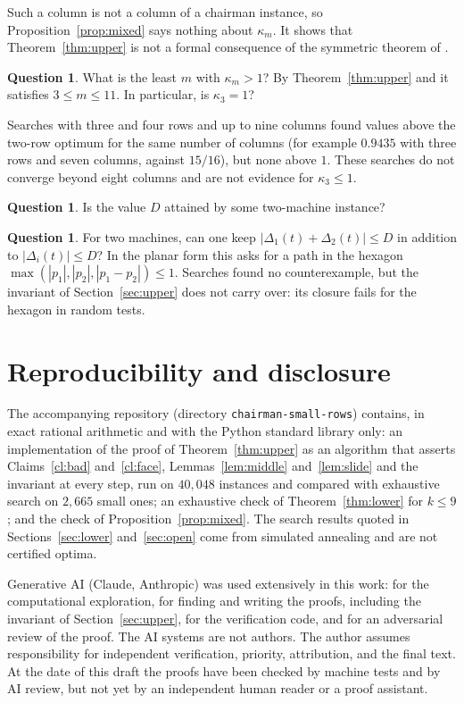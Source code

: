 \documentclass[11pt]{article}
\theoremstyle{definition}
\newtheorem{question}[theorem]{Question}
\newcommand{\disc}{\Delta}
\begin{document}
Such a column is not a column of a chairman instance, so
Proposition~\ref{prop:mixed} says nothing about $\kappa_m$.  It shows that
Theorem~\ref{thm:upper} is not a formal consequence of the symmetric
theorem of \citep{LundMagazinov2015}.

\begin{question}
What is the least $m$ with $\kappa_m>1$?  By Theorem~\ref{thm:upper} and
\citep{Muffatti2026} it satisfies $3\le m\le11$.  In particular, is
$\kappa_3=1$?
\end{question}

Searches with three and four rows and up to nine columns found values
above the two-row optimum for the same number of columns (for example
$0.9435$ with three rows and seven columns, against $15/16$), but none
above $1$.  These searches do not converge beyond eight columns and are
not evidence for $\kappa_3\le1$.

\begin{question}
Is the value $D$ attained by some two-machine instance?
\end{question}

\begin{question}
For two machines, can one keep $|\disc_1(t)+\disc_2(t)|\le D$ in addition
to $|\disc_i(t)|\le D$?  In the planar form this asks for a path in the
hexagon $\max(|p_1|,|p_2|,|p_1-p_2|)\le1$.  Searches found no
counterexample, but the invariant of Section~\ref{sec:upper} does not
carry over: its closure fails for the hexagon in random tests.
\end{question}

\section*{Reproducibility and disclosure}

The accompanying repository (directory \texttt{chairman-small-rows})
contains, in exact rational arithmetic and with the Python standard
library only: an implementation of the proof of Theorem~\ref{thm:upper}
as an algorithm that asserts Claims~\ref{cl:bad} and~\ref{cl:face},
Lemmas~\ref{lem:middle} and~\ref{lem:slide} and the invariant at every
step, run on $40{,}048$ instances and compared with exhaustive search on
$2{,}665$ small ones; an exhaustive check of Theorem~\ref{thm:lower} for
$k\le9$; and the check of Proposition~\ref{prop:mixed}.  The search
results quoted in Sections~\ref{sec:lower} and~\ref{sec:open} come from
simulated annealing and are not certified optima.

Generative AI (Claude, Anthropic) was used extensively in this work: for
the computational exploration, for finding and writing the proofs,
including the invariant of Section~\ref{sec:upper}, for the verification
code, and for an adversarial review of the proof.  The AI systems are not
authors.  The author assumes responsibility for independent verification,
priority, attribution, and the final text.  At the date of this draft the
proofs have been checked by machine tests and by AI review, but not yet
by an independent human reader or a proof assistant.



\end{document}
